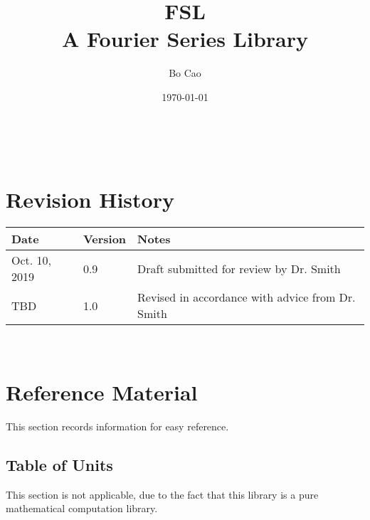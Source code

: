 \documentclass[12pt]{article}
\newcommand{\famname}{FSL} %
\begin{document}
\title{\famname\\A Fourier Series Library} 
\author{Bo Cao}
\date{\today}

\maketitle

~\newpage


\section{Revision History}

\begin{tabularx}{\textwidth}{p{3cm}p{2cm}X}
\toprule {\bf Date} & {\bf Version} & {\bf Notes}\\
\midrule
Oct. 10, 2019 & 0.9 & Draft submitted for review by Dr. Smith\\
TBD & 1.0 & Revised in accordance with advice from Dr. Smith\\
\bottomrule
\end{tabularx}

~\newpage
	
\section{Reference Material}

This section records information for easy reference.

\subsection{Table of Units}

This section is not applicable, due to the fact that this library is a pure mathematical computation library.
\end{document}
